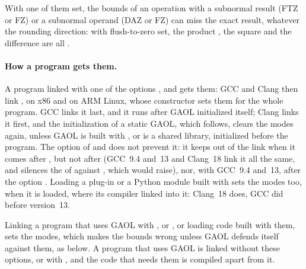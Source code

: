 \noindent
With one of them set, the bounds of an operation with a subnormal result (FTZ
or FZ) or a subnormal operand (DAZ or FZ) can miss the exact result, whatever
the rounding direction:
with flush-to-zero set, the product , the square
 and the difference
 are all .\newinvfive

\medskip
\paragraph{How a program gets them.} A program linked with one of the options
,  and 
gets them: GCC and Clang then link , on x86 and on ARM
Linux, whose constructor sets them for the whole program. GCC links it last,
and it runs after GAOL initialized itself; Clang links it first, and the
initialization of a static GAOL, which follows, clears the modes again,
unless GAOL is built with , or is a shared
library, initialized before the program. The option 
of  and  does not prevent it: it keeps
 out of the link when it comes after
, but not after  (GCC~9.4 and~13 and
Clang~18 link it all the same, and  silences the
 of  against ,
which  would raise), nor, with GCC~9.4 and~13, after the
option . Loading a plug-in or a Python
module built with  sets the modes too, when it is loaded,
where its compiler linked  into it: Clang~18 does, GCC
did before version~13.

\begin{Rem}\label{rem:ofast}
Linking a program that uses GAOL with , 
or , or loading code built with them,
sets the modes, which makes the bounds wrong unless GAOL defends itself
against them, as below. A program that uses GAOL is linked without these
options, or with , and the code that needs them is
compiled apart from it.
\end{Rem}

